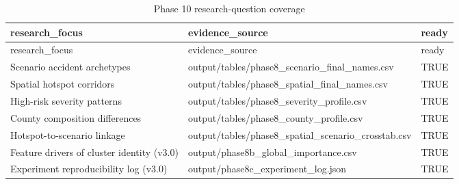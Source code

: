 \documentclass[
]{article}
\begin{document}
\begin{longtable}[]{@{}
  >{\raggedright\arraybackslash}p{}
  >{\raggedright\arraybackslash}p{}
  >{\raggedright\arraybackslash}p{}@{}}
\caption{Phase 10 research-question coverage}\tabularnewline
\toprule\noalign{}
\begin{minipage}[b]{\linewidth}\raggedright
research\_focus
\end{minipage} & \begin{minipage}[b]{\linewidth}\raggedright
evidence\_source
\end{minipage} & \begin{minipage}[b]{\linewidth}\raggedright
ready
\end{minipage} \\
\midrule\noalign{}
\endfirsthead
\toprule\noalign{}
\begin{minipage}[b]{\linewidth}\raggedright
research\_focus
\end{minipage} & \begin{minipage}[b]{\linewidth}\raggedright
evidence\_source
\end{minipage} & \begin{minipage}[b]{\linewidth}\raggedright
ready
\end{minipage} \\
\midrule\noalign{}
\endhead
\bottomrule\noalign{}
\endlastfoot
Scenario accident archetypes &
output/tables/phase8\_scenario\_final\_names.csv & TRUE \\
Spatial hotspot corridors &
output/tables/phase8\_spatial\_final\_names.csv & TRUE \\
High-risk severity patterns &
output/tables/phase8\_severity\_profile.csv & TRUE \\
County composition differences &
output/tables/phase8\_county\_profile.csv & TRUE \\
Hotspot-to-scenario linkage &
output/tables/phase8\_spatial\_scenario\_crosstab.csv & TRUE \\
Feature drivers of cluster identity (v3.0) &
output/phase8b\_global\_importance.csv & TRUE \\
Experiment reproducibility log (v3.0) &
output/phase8c\_experiment\_log.json & TRUE \\
\end{longtable}
\end{document}
